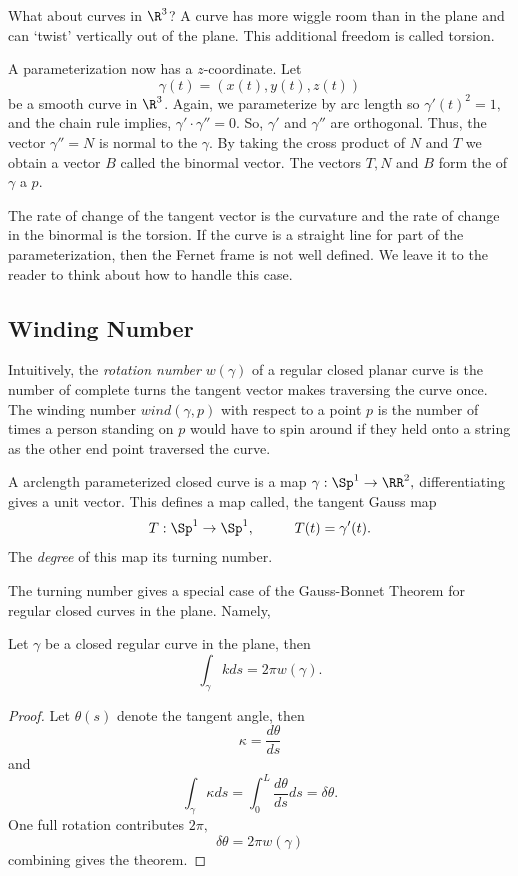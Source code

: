 What about curves in $\R^3$? A curve has more wiggle room than in the plane
and can `twist' vertically out of the plane.
This additional freedom is called torsion.


A parameterization now has a $z$-coordinate. Let $$\gamma(t)=(x(t),y(t),z(t))$$ be a smooth curve in $\R^3$.
Again, we parameterize by arc length so $\gamma'(t)^2=1,$ and the chain rule implies, $\gamma'\cdot \gamma''=0$.
So, $\gamma'$ and $\gamma''$ are orthogonal.
Thus, the
vector $\gamma''=N$ is normal to the $\gamma$. 
By taking the cross product of $N$ and $T$ we obtain a vector $B$ called
the binormal vector.
The vectors $T,N$ and $B$ form the  of $\gamma$ a $p.$


The rate of change of the tangent vector is the curvature and the rate of change in
the binormal is the torsion. If the curve is a straight line for part of the parameterization,
then the Fernet frame is not well defined. We leave it to the reader to think about how to handle
this case.

\subsection{Winding Number}


Intuitively, the \emph{rotation number} $w(\gamma)$ of a regular closed planar curve is the number
of complete turns the tangent vector makes traversing the curve once.
The winding number $wind(\gamma,p)$ with respect to a point $p$ is the number of times a person standing on $p$ would have to spin around if they held onto a string as the other end point traversed the curve.


A arclength parameterized closed curve is a map $\gamma:\Sp^1\rightarrow \RR^2,$ differentiating
gives a unit vector. This defines a map called, the tangent Gauss map
$$T:\Sp^1\rightarrow \Sp^1,\hspace{1cm} T(t)=\gamma'(t).$$
The \emph{degree} of this map its turning number.


The turning number gives a special case of the Gauss-Bonnet Theorem for regular closed
curves in the plane.
Namely,
\begin{theorem}\label{thm:curves-bonnet}
Let $\gamma$ be a closed regular curve in the plane, then
$$\int_\gamma k ds=2\pi w(\gamma).$$
\end{theorem}
\begin{proof}
Let $\theta(s)$ denote the tangent angle,
then $$\kappa=\frac{d\theta}{ds}$$
and
$$\int_\gamma \kappa ds=\int_0^L\frac{d\theta}{ds}ds=\delta \theta.$$
One full rotation contributes $2\pi,$
$$\delta \theta=2\pi w(\gamma)$$
combining gives the theorem.
\end{proof}

